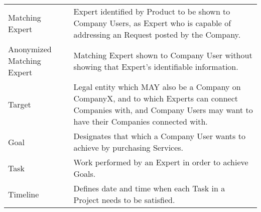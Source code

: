 \begin{longtable}{lp{7.5cm}}
Matching Expert            & Expert identified by Product to be shown to Company Users, as Expert who is capable of addressing an Request posted by the Company.                                                                                                                                                                                                                                       \\
Anonymized Matching Expert & Matching Expert shown to Company User without showing that Expert’s identifiable information.                                                                                                                                                                                                                                                                             \\
Target                     & Legal entity which MAY also be a Company on CompanyX, and to which Experts can connect Companies with, and Company Users may want to have their Companies connected with.                                                                                                                                                                                                 \\
Goal                       & Designates that which a Company User wants to achieve by purchasing Services.                                                                                                                                                                                                                                                                                             \\
Task                       & Work performed by an Expert in order to achieve Goals.                                                                                                                                                                                                                                                                                                                    \\
Timeline                   & Defines date and time when each Task in a Project needs to be satisfied.                                                                                                                                                                                                                                                                                                  \\

\end{longtable}
